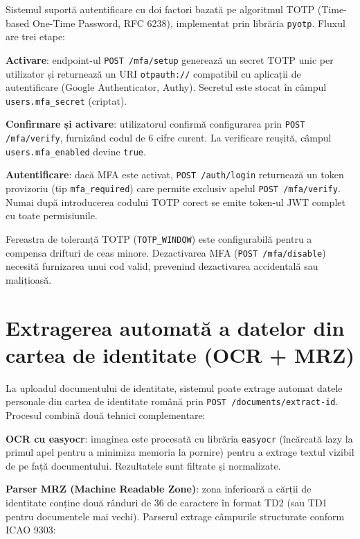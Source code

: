 \documentclass[12pt,a4paper]{report}
\begin{document}
Sistemul suportă autentificare cu doi factori bazată pe algoritmul TOTP (Time-based One-Time Password, RFC 6238), implementat prin librăria \texttt{pyotp}. Fluxul are trei etape:

\textbf{Activare}: endpoint-ul \texttt{POST /mfa/setup} generează un secret TOTP unic per utilizator și returnează un URI \texttt{otpauth://} compatibil cu aplicații de autentificare (Google Authenticator, Authy). Secretul este stocat în câmpul \texttt{users.mfa\_secret} (criptat).

\textbf{Confirmare și activare}: utilizatorul confirmă configurarea prin \texttt{POST /mfa/verify}, furnizând codul de 6 cifre curent. La verificare reușită, câmpul \texttt{users.mfa\_enabled} devine \texttt{true}.

\textbf{Autentificare}: dacă MFA este activat, \texttt{POST /auth/login} returnează un token provizoriu (tip \texttt{mfa\_required}) care permite exclusiv apelul \texttt{POST /mfa/verify}. Numai după introducerea codului TOTP corect se emite token-ul JWT complet cu toate permisiunile.

Fereastra de toleranță TOTP (\texttt{TOTP\_WINDOW}) este configurabilă pentru a compensa drifturi de ceas minore. Dezactivarea MFA (\texttt{POST /mfa/disable}) necesită furnizarea unui cod valid, prevenind dezactivarea accidentală sau malițioasă.

\section{Extragerea automată a datelor din cartea de identitate (OCR + MRZ)}

La uploadul documentului de identitate, sistemul poate extrage automat datele personale din cartea de identitate română prin \texttt{POST /documents/extract-id}. Procesul combină două tehnici complementare:

\textbf{OCR cu easyocr}: imaginea este procesată cu librăria \texttt{easyocr} (încărcată lazy la primul apel pentru a minimiza memoria la pornire) pentru a extrage textul vizibil de pe față documentului. Rezultatele sunt filtrate și normalizate.

\textbf{Parser MRZ (Machine Readable Zone)}: zona inferioară a cărții de identitate conține două rânduri de 36 de caractere în format TD2 (sau TD1 pentru documentele mai vechi). Parserul extrage câmpurile structurate conform ICAO 9303:
\end{document}
